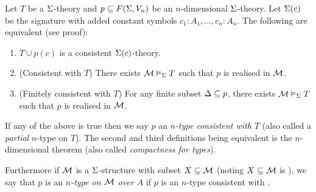 \begin{dfn}
    Let $T$ be a $\Sigma$-theory and $p \subseteq F(\Sigma,V_n)$ 
    be an $n$-dimensional $\Sigma$-theory.
    Let $\Sigma(c)$ be the signature with added constant symbols
    $c_1 : A_1,\dots,c_n : A_n$.
    The following are equivalent (see proof):
    \begin{enumerate}
        \item $T \cup p(c)$ is a consistent $\Sigma(c)$-theory.
        \item (Consistent with $T$) There exists 
            $\mathcal{M} \vDash_{\Sigma} T$ such that $p$ is realised in $\mathcal{M}$. 
        \item (Finitely consistent with $T$) 
            For any finite subset $\Delta \subseteq p$, there exists 
            $\mathcal{M} \vDash_{\Sigma} T$ such that $p$ is realised in $\mathcal{M}$.
    \end{enumerate}
    If any of the above is true then we say $p$ an \textit{$n$-type 
    consistent with $T$} 
    (also called a \textit{partial} $n$-type on $T$).
    The second and third definitions being equivalent is 
    the $n$-dimensional  theorem 
    (also called \textit{compactness for types}).

    Furthermore if $\mathcal{M}$ is a $\Sigma$-structure with subset $X \subseteq \mathcal{M}$
    (noting $X \subseteq \mathcal{M}$ is ), 
    we say that $p$ is an \textit{$n$-type on $\mathcal{M}$ over $A$} if 
    $p$ is an $n$-type consistent with 
    .
\end{dfn}
